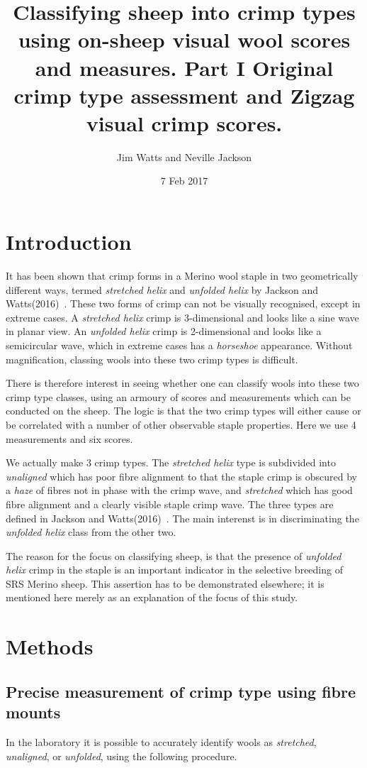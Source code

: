 \documentclass[titlepage]{article}  %
\title{Classifying sheep into crimp types using on-sheep visual wool scores and measures. Part I Original crimp type assessment and Zigzag visual crimp scores. }
\author{Jim Watts and Neville Jackson}
\date{7 Feb 2017}
\begin{document}
 
 
\maketitle      
\tableofcontents

\clearpage
\section{Introduction} 
It has been shown that crimp forms in a Merino wool staple in two geometrically different ways, termed {\em stretched helix} and {\em unfolded helix} by Jackson and Watts(2016)~\cite{jack:16}.  These two forms of crimp can not be visually recognised, except in extreme cases. A {\em stretched helix} crimp is 3-dimensional and looks like a sine wave in planar view. An {\em unfolded helix} crimp is 2-dimensional and looks like a semicircular wave, which in extreme cases has a {\em horseshoe} appearance. Without magnification, classing wools into these two crimp types is difficult.
 
There is therefore interest in seeing whether one can classify wools into these two crimp type classes, using an armoury of scores and measurements which can be conducted on the sheep. The logic is that the two crimp types will either cause or be correlated with a number of other observable staple properties. Here we use 4 measurements and six scores.

We actually make 3 crimp types. The {\em stretched helix} type is subdivided into {\em unaligned} which has poor fibre alignment to that the staple crimp is obscured by a {\em haze} of fibres not in phase with the crimp wave, and {\em stretched} which has good fibre alignment and a clearly visible staple crimp wave. The three types are defined in Jackson and Watts(2016)~\cite{jack:16}. The main interenst is in discriminating the {\em unfolded helix} class from the other two.

The reason for the focus on classifying sheep, is that the presence of {\em unfolded helix} crimp in the staple is an important indicator in the selective breeding of SRS Merino sheep. This assertion has to be demonstrated elsewhere; it is mentioned here merely as an explanation of the focus of this study.


\section{Methods}
\subsection{Precise measurement of crimp type using fibre mounts}
In the laboratory it is possible to accurately identify wools as {\em stretched}, {\em unaligned}, or {\em unfolded}, using the following procedure.
\end{document}
